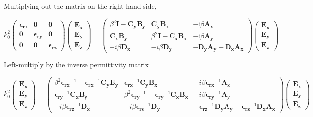 \documentclass[]{article}
\begin{document}
Multiplying out the matrix on the right-hand side,

\begin{equation*}
k_0^2
\begin{pmatrix}
\mathbf{\epsilon_{rx}} & \mathbf{0} & \mathbf{0} \\
\mathbf{0} & \mathbf{\epsilon_{ry}} & \mathbf{0} \\
\mathbf{0} & \mathbf{0} & \mathbf{\epsilon_{rz}}
\end{pmatrix}
\begin{pmatrix}
\mathbf{E_x} \\
\mathbf{E_y} \\
\mathbf{E_z}
\end{pmatrix}
=
\begin{pmatrix}
\beta^2 \mathbf{I} - \mathbf{C_y}\mathbf{B_y}
&
\mathbf{C_y} \mathbf{B_x}
&
-i \beta \mathbf{A_x}
\\
\mathbf{C_x}\mathbf{B_y}
&
\beta^2 \mathbf{I} - \mathbf{C_x}\mathbf{B_x}
&
-i \beta \mathbf{A_y}
\\
-i \beta \mathbf{D_x}
&
-i \beta \mathbf{D_y}
&
-\mathbf{D_y} \mathbf{A_y} - \mathbf{D_x}\mathbf{A_x}
\end{pmatrix}
\begin{pmatrix}
\mathbf{E_x} \\
\mathbf{E_y} \\
\mathbf{E_z}
\end{pmatrix}
\end{equation*}

Left-multiply by the inverse permittivity matrix

\begin{equation*}
k_0^2
\begin{pmatrix}
\mathbf{E_x} \\
\mathbf{E_y} \\
\mathbf{E_z}
\end{pmatrix}
=
\begin{pmatrix}
\beta^2 \mathbf{\epsilon_{rx}}^{-1}- \mathbf{\epsilon_{rx}}^{-1} \mathbf{C_y}\mathbf{B_y}
&
\mathbf{\epsilon_{rx}}^{-1} \mathbf{C_y} \mathbf{B_x}
&
-i \beta \mathbf{\epsilon_{rx}}^{-1} \mathbf{A_x}
\\
\mathbf{\epsilon_{ry}}^{-1} \mathbf{C_x}\mathbf{B_y}
&
\beta^2 \mathbf{\epsilon_{ry}}^{-1} - \mathbf{\epsilon_{ry}}^{-1} \mathbf{C_x}\mathbf{B_x}
&
-i \beta \mathbf{\epsilon_{ry}}^{-1} \mathbf{A_y}
\\
-i \beta \mathbf{\epsilon_{rz}}^{-1} \mathbf{D_x}
&
-i \beta \mathbf{\epsilon_{rz}}^{-1} \mathbf{D_y}
&
-\mathbf{\epsilon_{rz}}^{-1} \mathbf{D_y} \mathbf{A_y} - \mathbf{\epsilon_{rz}}^{-1} \mathbf{D_x}\mathbf{A_x}
\end{pmatrix}
\begin{pmatrix}
\mathbf{E_x} \\
\mathbf{E_y} \\
\mathbf{E_z}
\end{pmatrix}
\end{equation*}
\end{document}

